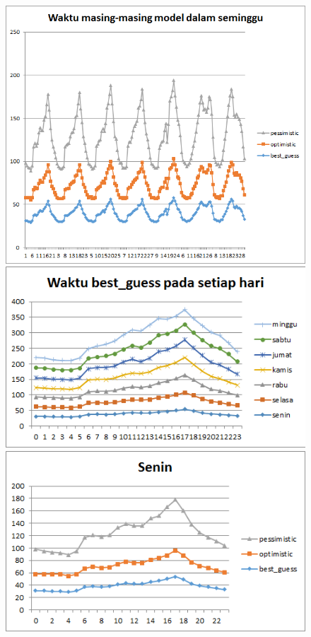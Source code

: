 				\begin{figure}[H]
				\centering		
				\includegraphics[scale=0.8]{Gambar/waktuallmodelsampel208052017.png}
				\includegraphics[]{Gambar/waktubestguesssampel208052017.png}
				\includegraphics[]{Gambar/seninsampel208052017.png}
			\end{figure}
			
